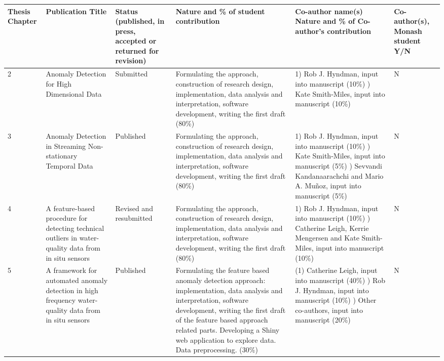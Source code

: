 \documentclass{monashthesis}
\theoremstyle{definition}
\theoremstyle{definition}
\theoremstyle{definition}
\theoremstyle{remark}
\begin{document}
\begin{table}[H]
\small
\begin{tabular}{|p{0.5cm}|p{2cm}|p{1.5cm}|p{4cm}|p{3.5cm}|p{1cm}|}
\rowcolor[HTML]{000000} 
{\color[HTML]{FFFFFF} \textbf{Thesis Chapter} } & {\color[HTML]{FFFFFF} \textbf{Publication Title} } & {\color[HTML]{FFFFFF} \textbf{Status (published, in press, accepted or returned for revision)} } & {\color[HTML]{FFFFFF} \textbf{Nature and \% of student contribution}}& {\color[HTML]{FFFFFF} \textbf{Co-author name(s) Nature and \% of Co-author’s contribution}} & {\color[HTML]{FFFFFF} \textbf{Co-author(s), Monash student Y/N }} \\ \hline
 2 & Anomaly Detection for High Dimensional Data   &  Submitted  &  Formulating the approach, construction of research design, implementation, data analysis and interpretation, software development, writing the first draft (80\%)    & 1) Rob J. Hyndman, input into manuscript (10\%) \newline 2) Kate Smith-Miles, input into manuscript (10\%)  & N
 \\ \hline
3  & Anomaly Detection in Streaming Non-stationary Temporal Data  & Published   & Formulating the approach, construction of research design, implementation, data analysis and interpretation, software development, writing the first draft (80\%)   & 1) Rob J. Hyndman, input into manuscript (10\%) \newline 2) Kate Smith-Miles, input into manuscript (5\%) \newline 3) Sevvandi Kandanaarachchi and Mario A. Mu\~noz, input into manuscript (5\%)  & N  
\\ \hline
4  & A feature-based procedure for detecting technical outliers in water-quality data from in situ sensors  &  Revised and resubmitted & Formulating the approach, construction of research design, implementation, data analysis and interpretation, software development, writing the first draft (80\%)  & 1) Rob J. Hyndman, input into manuscript (10\%) \newline  2) Catherine Leigh, Kerrie Mengersen and Kate Smith-Miles, input into manuscript (10\%) & N  
\\ \hline
5  & A framework for automated anomaly detection in high frequency water-quality data from in situ sensors  &    Published &  Formulating the feature based anomaly detection approach: implementation, data analysis and interpretation, software development, writing the first draft of the feature based approach related parts. Developing a Shiny web application to explore data. Data preprocessing. (30\%)    & (1) Catherine Leigh, input into manuscript (40\%) \newline  2) Rob J. Hyndman, input into manuscript (10\%) \newline
3) Other co-authors, input into manuscript (20\%) & N  
\\ \hline
\end{tabular}
\end{table}
\end{document}
